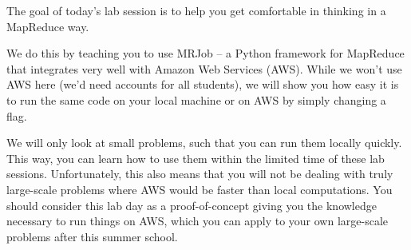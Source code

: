 The goal of today's lab session is to help you get comfortable in thinking in a MapReduce way.

We do this by teaching you to use MRJob -- a Python framework for MapReduce that integrates very well with Amazon Web Services (AWS). While we won't use AWS here (we'd need accounts for all students), we will show you how easy it is to run the same code on your local machine or on AWS by simply changing a flag.

We will only look at small problems, such that you can run them locally quickly. This way, you can learn how to use them within the limited time of these lab sessions. Unfortunately, this also means that you will not be dealing with truly large-scale problems where AWS would be faster than local computations. You should consider this lab day as a proof-of-concept giving you the knowledge necessary to run things on AWS, which you can apply to your own large-scale problems after this summer school.

\iffalse
\subsection*{Connecting to Amazon WebServices}

In these two lab days, you will use three machines:

\begin{enumerate}
\item Your \emph{local machine}, which may be your personal laptop or one of
the computers at IST. From this machine, you will use SSH to login to:
\item Your AWS machine, which is a regular Linux box which runs on the cloud
and is private to you. You should use this machine to edit the code and test
it.
\item The Elastic MapReduce cluster machines. You cannot directly login to
them, but will use automated tools to submit jobs and get back the results.
\end{enumerate}

\subsection*{Running at Home}

After the summer school is over, you can run the same code on your local
machine or your own AWS machine. For this, you will need to get an Amazon
account for yourself. Then, you will receive AWS credentials which will give
you full permissions to run it in multiple modes.
\fi

